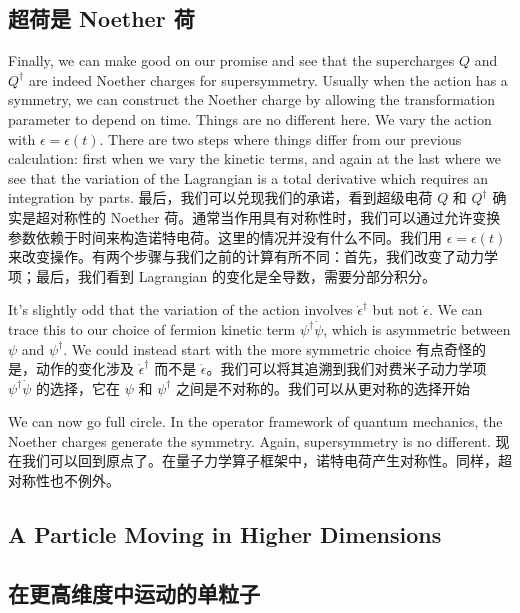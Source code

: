\documentclass{article}
\begin{document}
\begin{paracol}{2}
\subsection*{超荷是 Noether 荷}
\switchcolumn*

Finally, we can make good on our promise and see that the supercharges $Q$ and $Q^{\dagger}$ are indeed Noether charges for supersymmetry. Usually when the action has a symmetry, we can construct the Noether charge by allowing the transformation parameter to depend on time. Things are no different here. We vary the action with $\epsilon = \epsilon(t)$. There are two steps where things differ from our previous calculation: first when we vary the kinetic terms, and again at the last where we see that the variation of the Lagrangian is a total derivative which requires an integration by parts.
\switchcolumn
最后，我们可以兑现我们的承诺，看到超级电荷 $Q$ 和 $Q^{\dagger}$ 确实是超对称性的 Noether 荷。通常当作用具有对称性时，我们可以通过允许变换参数依赖于时间来构造诺特电荷。这里的情况并没有什么不同。我们用 $\epsilon = \epsilon(t)$ 来改变操作。有两个步骤与我们之前的计算有所不同：首先，我们改变了动力学项；最后，我们看到 Lagrangian 的变化是全导数，需要分部分积分。
\switchcolumn*

It's slightly odd that the variation of the action involves $\dot{\epsilon}^{\dagger}$ but not $\dot{\epsilon}$. We can trace this to our choice of fermion kinetic term $\psi^{\dagger} \dot{\psi}$, which is asymmetric between $\psi$ and $\psi^{\dagger}$. We could instead start with the more symmetric choice
\switchcolumn
有点奇怪的是，动作的变化涉及 $\dot{\epsilon}^{\dagger}$ 而不是 $\dot{\epsilon}$。我们可以将其追溯到我们对费米子动力学项 $\psi^{\dagger} \dot{\psi}$ 的选择，它在 $\psi$ 和 $\psi^{\dagger}$ 之间是不对称的。我们可以从更对称的选择开始
\switchcolumn*

We can now go full circle. In the operator framework of quantum mechanics, the Noether charges generate the symmetry. Again, supersymmetry is no different.
\switchcolumn
现在我们可以回到原点了。在量子力学算子框架中，诺特电荷产生对称性。同样，超对称性也不例外。
\switchcolumn*

\subsection{A Particle Moving in Higher Dimensions}
\switchcolumn
\subsection*{在更高维度中运动的单粒子}
\switchcolumn*


\end{paracol}
\end{document}
